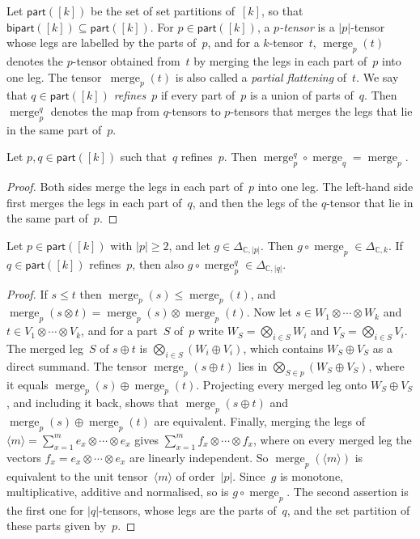 \documentclass[11pt,letterpaper]{article}
\DeclareMathOperator{\merge}{merge}
\newcommand{\parts}{\mathsf{part}}
\newcommand{\bipart}{\mathsf{bipart}}
\newcommand{\CC}{\mathbb{C}}
\begin{document}
Let $\parts([k])$ be the set of set partitions of~$[k]$, so that $\bipart([k]) \subseteq \parts([k])$. For $p \in \parts([k])$, a \emph{$p$-tensor} is a $|p|$-tensor whose legs are labelled by the parts of~$p$, and for a $k$-tensor~$t$, $\merge_{p}(t)$ denotes the $p$-tensor obtained from~$t$ by merging the legs in each part of~$p$ into one leg. The tensor~$\merge_p(t)$ is also called a \emph{partial flattening} of~$t$. We say that $q \in \parts([k])$ \emph{refines}~$p$ if every part of~$p$ is a union of parts of~$q$. Then~$\merge^{q}_{p}$ denotes the map from $q$-tensors to $p$-tensors that merges the legs that lie in the same part of~$p$. 
\begin{lemma}\label{lem:merge-compose}
Let $p, q \in \parts([k])$ such that~$q$ refines~$p$. Then $\merge^{q}_{p} \circ \merge_{q} = \merge_p$.
\end{lemma}
\begin{proof}
Both sides merge the legs in each part of~$p$ into one leg. The left-hand side first merges the legs in each part of~$q$, and then the legs of the $q$-tensor that lie in the same part of~$p$.
\end{proof}

\begin{lemma}\label{lem:merge-spectral}
Let $p \in \parts([k])$ with $|p| \geq 2$, and let $g \in \Delta_{\CC,|p|}$. Then $g \circ \merge_{p} \in \Delta_{\CC,k}$. If $q \in \parts([k])$ refines~$p$, then also $g \circ \merge^{q}_{p} \in \Delta_{\CC,|q|}$.
\end{lemma}
\begin{proof}
If $s \leq t$ then $\merge_{p}(s) \leq \merge_{p}(t)$, and $\merge_{p}(s \otimes t) = \merge_{p}(s) \otimes \merge_{p}(t)$. Now let $s \in W_1 \otimes \cdots \otimes W_k$ and $t \in V_1 \otimes \cdots \otimes V_k$, and for a part~$S$ of~$p$ write $W_S = \bigotimes_{i \in S} W_i$ and $V_S = \bigotimes_{i \in S} V_i$. The merged leg~$S$ of $s \oplus t$ is $\bigotimes_{i \in S} (W_i \oplus V_i)$, which contains $W_S \oplus V_S$ as a direct summand. The tensor $\merge_{p}(s \oplus t)$ lies in $\bigotimes_{S \in p} (W_S \oplus V_S)$, where it equals $\merge_{p}(s) \oplus \merge_{p}(t)$. Projecting every merged leg onto $W_S \oplus V_S$, and including it back, shows that $\merge_{p}(s \oplus t)$ and $\merge_{p}(s) \oplus \merge_{p}(t)$ are equivalent. Finally, merging the legs of $\langle m \rangle = \sum_{x=1}^m e_x \otimes \cdots \otimes e_x$ gives $\sum_{x=1}^m f_x \otimes \cdots \otimes f_x$, where on every merged leg the vectors $f_x = e_x \otimes \cdots \otimes e_x$ are linearly independent. So $\merge_{p}(\langle m \rangle)$ is equivalent to the unit tensor~$\langle m \rangle$ of order~$|p|$. Since~$g$ is monotone, multiplicative, additive and normalised, so is $g \circ \merge_{p}$. The second assertion is the first one for $|q|$-tensors, whose legs are the parts of~$q$, and the set partition of these parts given by~$p$.
\end{proof}
\end{document}

